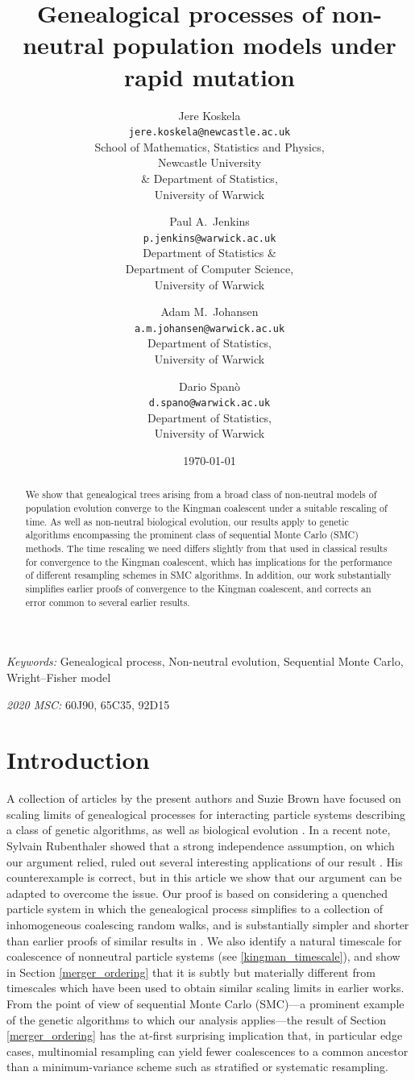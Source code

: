 \documentclass[a4paper,11pt]{article}
\title{Genealogical processes of non-neutral population models under rapid mutation}
\author{Jere Koskela \\
	\texttt{jere.koskela@newcastle.ac.uk} \\
	\small School of Mathematics, Statistics and Physics,\\
	\small Newcastle University \\
	\small \& Department of Statistics, \\
	\small University of Warwick \\
	\and
	Paul A.~Jenkins \\
	\texttt{p.jenkins@warwick.ac.uk} \\
	\small Department of Statistics \& \\ 
	\small Department of Computer Science, \\
	\small University of Warwick
	\and
	Adam M.~Johansen \\
	\texttt{a.m.johansen@warwick.ac.uk} \\
	\small Department of Statistics, \\
	\small University of Warwick \\
	\and
	Dario Span\`{o} \\
	\texttt{d.spano@warwick.ac.uk} \\
	\small Department of Statistics, \\
	\small University of Warwick
}
\date{\today}
\theoremstyle{definition}
\begin{document}
\maketitle

\begin{abstract}
We show that genealogical trees arising from a broad class of non-neutral models of population evolution converge to the Kingman coalescent under a suitable rescaling of time.
As well as non-neutral biological evolution, our results apply to genetic algorithms encompassing the prominent class of sequential Monte Carlo (SMC) methods.
The time rescaling we need differs slightly from that used in classical results for convergence to the Kingman coalescent, which has implications for the performance of different resampling schemes in SMC algorithms.
In addition, our work substantially simplifies earlier proofs of convergence to the Kingman coalescent, and corrects an error common to several earlier results.
\end{abstract}

\textit{Keywords:} Genealogical process, Non-neutral evolution, Sequential Monte Carlo, Wright--Fisher model

\textit{2020 MSC:} 60J90, 65C35, 92D15

\section{Introduction}

A collection of articles by the present authors and Suzie Brown have focused on scaling limits of genealogical processes for interacting particle systems describing a class of genetic algorithms, as well as biological evolution \cite{brown:2021, brownetal:2021, brownetal:2023, koskela2020annals}.
In a recent note, Sylvain Rubenthaler showed that a strong independence assumption, on which our argument relied, ruled out several interesting applications of our result \cite{rubenthaler:2023+}.
His counterexample is correct, but in this article we show that our argument can be adapted to overcome the issue.
Our proof is based on considering a quenched particle system in which the genealogical process simplifies to a collection of inhomogeneous coalescing random walks, and is substantially simpler and shorter than earlier proofs of similar results in \cite{brown:2021, brownetal:2021, brownetal:2023, koskela2020annals}. 
We also identify a natural timescale for coalescence of nonneutral particle systems (see \eqref{kingman_timescale}), and show in Section \ref{merger_ordering} that it is subtly but materially different from timescales which have been used to obtain similar scaling limits in earlier works.
From the point of view of sequential Monte Carlo (SMC)---a prominent example of the genetic algorithms to which our analysis applies---the result of Section \ref{merger_ordering} has the at-first surprising implication that, in particular edge cases, multinomial resampling can yield fewer coalescences to a common ancestor than a minimum-variance scheme such as stratified or systematic resampling.
\end{document}
